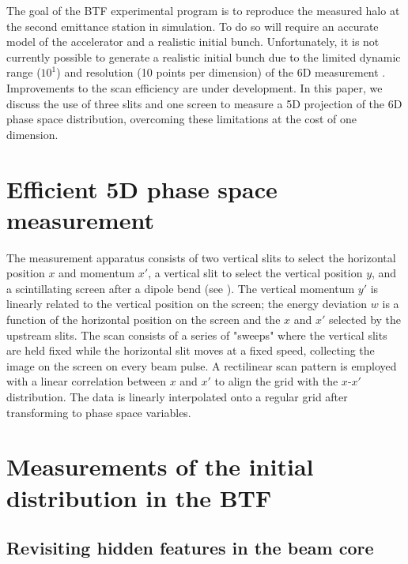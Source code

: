 \documentclass[letterpaper,
               keeplastbox,
               nospread,
               biblatex,
              ]{jacow}
\begin{document}
The goal of the BTF experimental program is to reproduce the measured halo at the second emittance station in simulation. To do so will require an accurate model of the accelerator and a realistic initial bunch. Unfortunately, it is not currently possible to generate a realistic initial bunch due to the limited dynamic range ($10^1$) and resolution (10 points per dimension) of the 6D measurement \cite{CatheyPRL}. Improvements to the scan efficiency are under development. In this paper, we discuss the use of three slits and one screen to measure a 5D projection of the 6D phase space distribution, overcoming these limitations at the cost of one dimension. 

\section{Efficient 5D phase space measurement}

The measurement apparatus consists of two vertical slits to select the horizontal position $x$ and momentum $x'$, a vertical slit to select the vertical position $y$, and a scintillating screen after a dipole bend (see \cite{Ruisard2022-NAPAC}). The vertical momentum $y'$ is linearly related to the vertical position on the screen; the energy deviation $w$ is a function of the horizontal position on the screen and the $x$ and $x'$ selected by the upstream slits. The scan consists of a series of "sweeps" where the vertical slits are held fixed while the horizontal slit moves at a fixed speed, collecting the image on the screen on every beam pulse. A rectilinear scan pattern is employed with a linear correlation between $x$ and $x'$ to align the grid with the $x$-$x'$ distribution. The data is linearly interpolated onto a regular grid after transforming to phase space variables.




\section{Measurements of the initial distribution in the BTF}

\subsection{Revisiting hidden features in the beam core}
\end{document}
